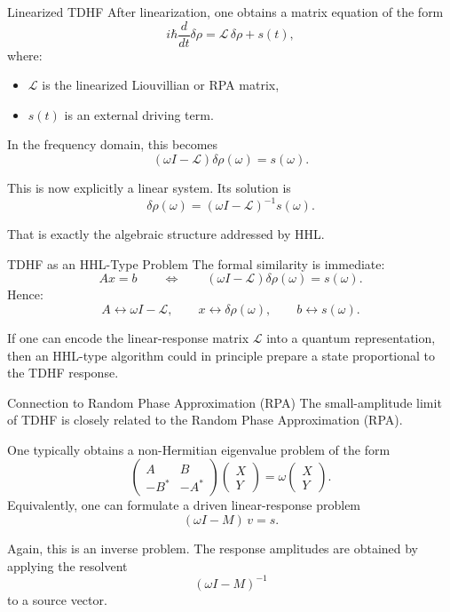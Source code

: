 \documentclass{beamer}
\begin{document}

\begin{frame}{Linearized TDHF}
  After linearization, one obtains a matrix equation of the form
  \[
  i\hbar \frac{d}{dt}\delta \rho = \mathcal{L}\,\delta \rho + s(t),
  \]
  where:
  \begin{itemize}
  \item \(\mathcal{L}\) is the linearized Liouvillian or RPA matrix,
  \item \(s(t)\) is an external driving term.
  \end{itemize}

  In the frequency domain, this becomes
  \[
  (\omega I - \mathcal{L}) \delta \rho(\omega) = s(\omega).
  \]

  This is now explicitly a linear system. Its solution is
  \[
  \delta \rho(\omega) = (\omega I - \mathcal{L})^{-1} s(\omega).
  \]

  That is exactly the algebraic structure addressed by HHL.
\end{frame}


\begin{frame}{TDHF as an HHL-Type Problem}
  The formal similarity is immediate:
  \[
  A x = b
  \qquad \Longleftrightarrow \qquad
  (\omega I - \mathcal{L}) \delta \rho(\omega) = s(\omega).
  \]
  Hence:
  \[
  A \leftrightarrow \omega I - \mathcal{L},
  \qquad
  x \leftrightarrow \delta \rho(\omega),
  \qquad
  b \leftrightarrow s(\omega).
  \]

  If one can encode the linear-response matrix \(\mathcal{L}\) into a quantum representation, then an HHL-type algorithm could in principle prepare a state proportional to the TDHF response.
\end{frame}


\begin{frame}{Connection to Random Phase Approximation (RPA)}
  The small-amplitude limit of TDHF is closely related to the Random Phase Approximation (RPA).

  One typically obtains a non-Hermitian eigenvalue problem of the form
  \[
  \begin{pmatrix}
    A & B \\
    -B^* & -A^*
  \end{pmatrix}
  \begin{pmatrix}
    X \\ Y
  \end{pmatrix}
  =
  \omega
  \begin{pmatrix}
    X \\ Y
  \end{pmatrix}.
  \]
  Equivalently, one can formulate a driven linear-response problem
  \[
  (\omega I - M)\,v = s.
  \]

  Again, this is an inverse problem. The response amplitudes are obtained by applying the resolvent
  \[
  (\omega I - M)^{-1}
  \]
  to a source vector.
\end{frame}
\end{document}
